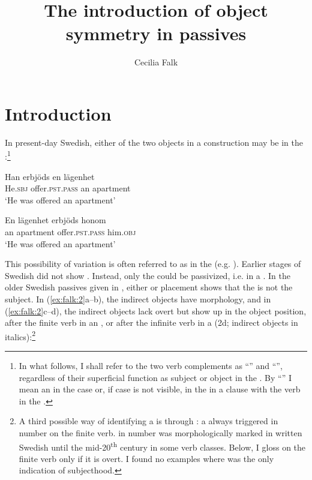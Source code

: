 \documentclass[output=paper]{langscibook}
\author{Cecilia Falk\affiliation{Stockholm University}}
\title{The introduction of object symmetry in passives}
\begin{document}
\maketitle


\section{Introduction}


In present-day Swedish, either of the two objects in a  construction may be  in the :\footnote{In what follows, I shall refer to the two verb complements as “” and “”, regardless of their superficial function as subject or object in the . By “” I mean an  in the  case or, if case is not visible, in the  in a clause with the verb in the .}

\ea%
    \label{ex:falk:1}
\ea
\gll Han    erbjöds      en  lägenhet\\
      He.\textsc{sbj}  offer.\textsc{pst}.\textsc{pass}  an  apartment\\
\glt ‘He was offered an apartment’

\ex
\gll En    lägenhet      erbjöds      honom\\
      an    apartment    offer.\textsc{pst}.\textsc{pass} him.\textsc{obj}\\
\glt ‘He was offered an apartment’
\z
\z


This possibility of variation is often referred to as  in the  (e.g. \citealt{Anagnostopoulou2003}). Earlier stages of Swedish did not show . Instead, only the  could be passivized, i.e.  in a . In the older Swedish passives given in , either  or placement shows that the  is not the subject. In (\ref{ex:falk:2}a–b), the indirect objects have  morphology, and in (\ref{ex:falk:2}c–d), the indirect objects lack overt  but show up in the object position, after the finite verb in an  , or after the infinite verb in a  (2d; indirect objects in italics):\footnote{A third possible way of identifying a  is through : a  always triggered  in number on the finite verb.  in number was morphologically marked in written Swedish until the mid-20\textsuperscript{th} century in some verb classes. Below, I gloss  on the finite verb only if it is overt. I found no examples where  was the only indication of subjecthood.}
\end{document}
